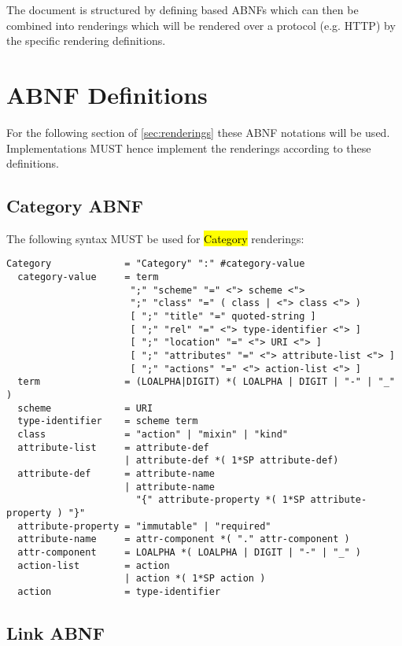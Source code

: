 \documentclass[10pt,a4paper]{article}
\begin{document}
The document is structured by defining based ABNFs which can then be combined into renderings which will be rendered over a protocol (e.g. HTTP) by the specific rendering definitions.

\section{ABNF Definitions}

For the following section of \ref{sec:renderings} these ABNF notations will be used. Implementations MUST hence implement the renderings according to these definitions.

\subsection{Category ABNF}

The following syntax MUST be used for \hl{Category} renderings:

\begin{verbatim}
Category             = "Category" ":" #category-value
  category-value     = term
                      ";" "scheme" "=" <"> scheme <">
                      ";" "class" "=" ( class | <"> class <"> )
                      [ ";" "title" "=" quoted-string ]
                      [ ";" "rel" "=" <"> type-identifier <"> ]
                      [ ";" "location" "=" <"> URI <"> ]
                      [ ";" "attributes" "=" <"> attribute-list <"> ]
                      [ ";" "actions" "=" <"> action-list <"> ]
  term               = (LOALPHA|DIGIT) *( LOALPHA | DIGIT | "-" | "_" )
  scheme             = URI
  type-identifier    = scheme term
  class              = "action" | "mixin" | "kind"
  attribute-list     = attribute-def
                     | attribute-def *( 1*SP attribute-def)
  attribute-def      = attribute-name
                     | attribute-name
                       "{" attribute-property *( 1*SP attribute-property ) "}"
  attribute-property = "immutable" | "required"
  attribute-name     = attr-component *( "." attr-component )
  attr-component     = LOALPHA *( LOALPHA | DIGIT | "-" | "_" )
  action-list        = action
                     | action *( 1*SP action )
  action             = type-identifier
\end{verbatim}

\subsection{Link ABNF}
\end{document}
